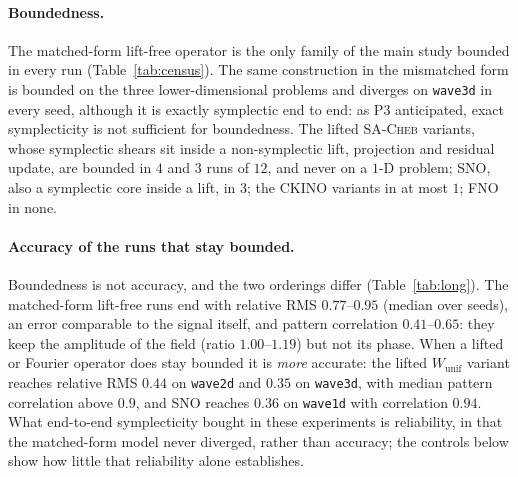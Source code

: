 \documentclass[11pt]{article}
\theoremstyle{definition}
\theoremstyle{remark}
\newcommand{\Wu}{W_{\mathrm{unif}}}
\newcommand{\sacheb}{\textsc{SA-Cheb}}
\newcommand{\ckino}{\textsc{CKINO}}
\begin{document}
\paragraph{Boundedness.} The matched-form lift-free operator is the only
family of the main study bounded in every run (Table~\ref{tab:census}). The same construction in
the mismatched form is bounded on the three lower-dimensional problems and
diverges on \texttt{wave3d} in every seed, although it is exactly symplectic end
to end: as P3 anticipated, exact symplecticity is not sufficient for
boundedness. The lifted \sacheb{} variants, whose symplectic shears sit inside a
non-symplectic lift, projection and residual update, are bounded in $4$ and $3$
runs of $12$, and never on a $1$-D problem; SNO, also a symplectic core inside a
lift, in $3$; the \ckino{} variants in at most $1$; FNO in none.

\paragraph{Accuracy of the runs that stay bounded.} Boundedness is not accuracy,
and the two orderings differ (Table~\ref{tab:long}). The matched-form lift-free
runs end with relative RMS $0.77$--$0.95$ (median over seeds), an error
comparable to the signal itself, and pattern correlation $0.41$--$0.65$: they
keep the amplitude of the field (ratio $1.00$--$1.19$) but not its phase. When a
lifted or Fourier operator does stay bounded it is \emph{more} accurate: the
lifted $\Wu$ variant reaches relative RMS $0.44$ on \texttt{wave2d} and $0.35$ on
\texttt{wave3d}, with median pattern correlation above $0.9$, and SNO reaches
$0.36$ on \texttt{wave1d} with correlation $0.94$. What end-to-end symplecticity
bought in these experiments is reliability, in that the matched-form model never
diverged, rather than accuracy; the controls below show how little that
reliability alone establishes.
\end{document}
